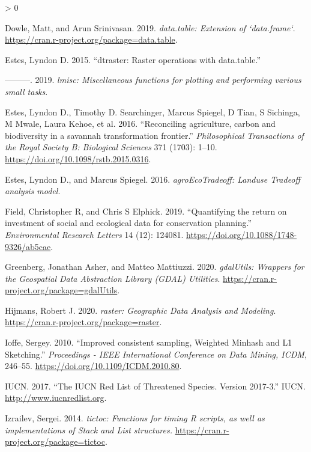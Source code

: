 \documentclass[
]{article}
\newlength{\cslhangindent}
\newenvironment{CSLReferences}[2] %
 {%
  \setlength{\parindent}{0pt}
  \ifodd #1 \everypar{\setlength{\hangindent}{\cslhangindent}}\ignorespaces\fi
  \ifnum #2 > 0
  \setlength{\parskip}{#2\baselineskip}
  \fi
 }%
 {}
\begin{document}
\begin{CSLReferences}{1}{0}
\leavevmode\hypertarget{ref-R-data.table}{}%
Dowle, Matt, and Arun Srinivasan. 2019. \emph{{data.table: Extension of `data.frame`}}. \url{https://cran.r-project.org/package=data.table}.

\leavevmode\hypertarget{ref-Estes2015}{}%
Estes, Lyndon D. 2015. {``{dtraster: Raster operations with data.table}.''}

\leavevmode\hypertarget{ref-R-lmisc}{}%
---------. 2019. \emph{{lmisc: Miscellaneous functions for plotting and performing various small tasks}}.

\leavevmode\hypertarget{ref-Estes2016a}{}%
Estes, Lyndon D., Timothy D. Searchinger, Marcus Spiegel, D Tian, S Sichinga, M Mwale, Laura Kehoe, et al. 2016. {``{Reconciling agriculture, carbon and biodiversity in a savannah transformation frontier}.''} \emph{Philosophical Transactions of the Royal Society B: Biological Sciences} 371 (1703): 1--10. \url{https://doi.org/10.1098/rstb.2015.0316}.

\leavevmode\hypertarget{ref-R-agroEcoTradeoff}{}%
Estes, Lyndon D., and Marcus Spiegel. 2016. \emph{{agroEcoTradeoff: Landuse Tradeoff analysis model}}.

\leavevmode\hypertarget{ref-Field2019}{}%
Field, Christopher R, and Chris S Elphick. 2019. {``{Quantifying the return on investment of social and ecological data for conservation planning}.''} \emph{Environmental Research Letters} 14 (12): 124081. \url{https://doi.org/10.1088/1748-9326/ab5cae}.

\leavevmode\hypertarget{ref-R-gdalUtils}{}%
Greenberg, Jonathan Asher, and Matteo Mattiuzzi. 2020. \emph{{gdalUtils: Wrappers for the Geospatial Data Abstraction Library (GDAL) Utilities}}. \url{https://cran.r-project.org/package=gdalUtils}.

\leavevmode\hypertarget{ref-R-raster}{}%
Hijmans, Robert J. 2020. \emph{{raster: Geographic Data Analysis and Modeling}}. \url{https://cran.r-project.org/package=raster}.

\leavevmode\hypertarget{ref-Ioffe2010}{}%
Ioffe, Sergey. 2010. {``{Improved consistent sampling, Weighted Minhash and L1 Sketching}.''} \emph{Proceedings - IEEE International Conference on Data Mining, ICDM}, 246--55. \url{https://doi.org/10.1109/ICDM.2010.80}.

\leavevmode\hypertarget{ref-IUCN2017}{}%
IUCN. 2017. {``{The IUCN Red List of Threatened Species. Version 2017-3}.''} IUCN. \url{http://www.iucnredlist.org}.

\leavevmode\hypertarget{ref-R-tictoc}{}%
Izrailev, Sergei. 2014. \emph{{tictoc: Functions for timing R scripts, as well as implementations of Stack and List structures.}} \url{https://cran.r-project.org/package=tictoc}.


\end{CSLReferences}
\end{document}
